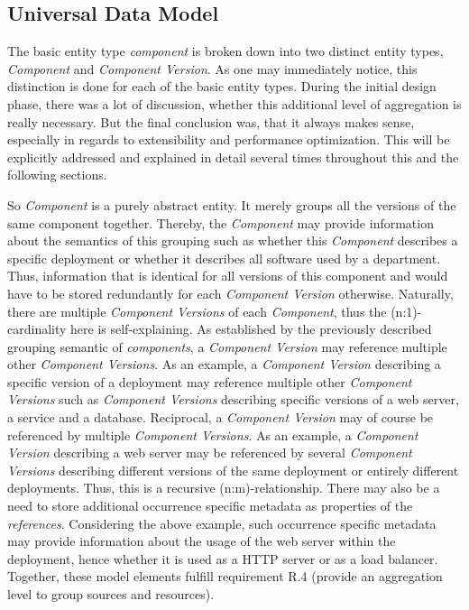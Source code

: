 \subsection{Universal Data Model}
The basic entity type \emph{component} is broken down into two distinct entity types, \emph{Component} and \emph{Component Version}. As one may immediately notice, this distinction is done for each of the basic entity types. During the initial design phase, there was a lot of discussion, whether this additional level of aggregation is really necessary. But the final conclusion was, that it always makes sense, especially in regards to extensibility and performance optimization. This will be explicitly addressed and explained in detail several times throughout this and the following sections.\par 
So \emph{Component} is a purely abstract entity. It merely groups all the versions of the same component together. Thereby, the \emph{Component} may provide information about the semantics of this grouping such as whether this \emph{Component} describes a specific deployment or whether it describes all software used by a department. Thus, information that is identical for all versions of this component and would have to be stored redundantly for each \emph{Component Version} otherwise. Naturally, there are multiple \emph{Component Versions} of each \emph{Component}, thus the (n:1)-cardinality here is self-explaining. As established by the previously described grouping semantic of \emph{components}, a \emph{Component Version} may reference multiple other \emph{Component Versions}. As an example, a \emph{Component Version} describing a specific version of a deployment may reference multiple other \emph{Component Versions} such as \emph{Component Versions} describing specific versions of a web server, a service and a database. Reciprocal, a \emph{Component Version} may of course be referenced by multiple \emph{Component Versions}. As an example, a \emph{Component Version} describing a web server may be referenced by several \emph{Component Versions} describing different versions of the same deployment or entirely different deployments. Thus, this is a recursive (n:m)-relationship. There may also be a need to store additional occurrence specific metadata as properties of the \emph{references}. Considering the above example, such occurrence specific metadata may provide information about the usage of the web server within the deployment, hence whether it is used as a HTTP server or as a load balancer. Together, these model elements fulfill requirement R.4 (provide an aggregation level to group sources and resources).\par
